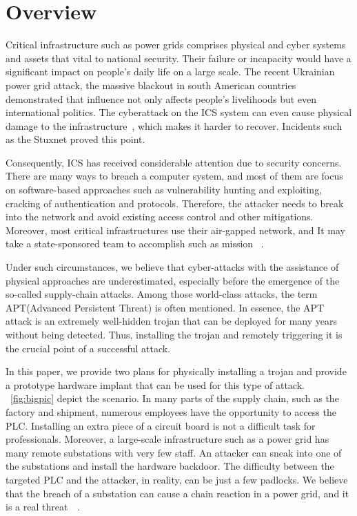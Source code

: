\section{Overview}
\label{sec:implant-overview}


Critical infrastructure such as power grids comprises physical and cyber systems and assets that vital to national security. Their failure or incapacity would have a significant impact on people's daily life on a large scale. The recent Ukrainian power grid attack, the massive blackout in south American countries~\cite{haes2019survey} demonstrated that influence not only affects people's livelihoods but even international politics. The cyberattack on the ICS system can even cause physical damage to the infrastructure~\cite{zeller2011myth}, which makes it harder to recover. Incidents such as the Stuxnet proved this point.

Consequently, ICS has received considerable attention due to security concerns. There are many ways to breach a computer system, and most of them are focus on software-based approaches such as vulnerability hunting and exploiting, cracking of authentication and protocols. Therefore, the attacker needs to break into the network and avoid existing access control and other mitigations. Moreover, most critical infrastructures use their air-gapped network, and It may take a state-sponsored team to accomplish such as mission ~\cite{langner2011stuxnet}. 

Under such circumstances, we believe that cyber-attacks with the assistance of physical approaches are underestimated, especially before the emergence of the so-called supply-chain attacks. Among those world-class attacks, the term APT(Advanced Persistent Threat) is often mentioned. In essence, the APT attack is an extremely well-hidden trojan that can be deployed for many years without being detected. Thus, installing the trojan and remotely triggering it is the crucial point of a successful attack.

In this paper, we provide two plans for physically installing a trojan and provide a prototype hardware implant \name that can be used for this type of attack. ~\autoref{fig:bigpic} depict the scenario. In many parts of the supply chain, such as the factory and shipment, numerous employees have the opportunity to access the PLC. Installing an extra piece of a circuit board is not a difficult task for professionals. Moreover, a large-scale infrastructure such as a power grid has many remote substations with very few staff. An attacker can sneak into one of the substations and install the hardware backdoor. The difficulty between the targeted PLC and the attacker, in reality, can be just a few padlocks. We believe that the breach of a substation can cause a chain reaction in a power grid, and it is a real threat~\cite{substationattack}~\cite{chen2020study}.


